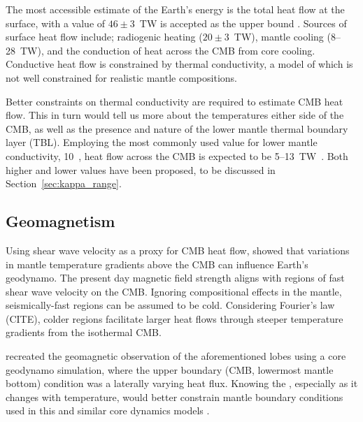 The most accessible estimate of the Earth's energy is the total heat flow at the surface, with a value of $46\pm3$~TW is accepted as the upper bound \citep{Lay2008}. Sources of surface heat flow include; radiogenic heating ($20\pm3$~TW), mantle cooling (8--28~TW), and the conduction of heat across the CMB from core cooling. Conductive heat flow is constrained by thermal conductivity, a model of which is not well constrained for realistic mantle compositions.

Better constraints on thermal conductivity are required to estimate CMB heat flow. This in turn would tell us more about the temperatures either side of the CMB, as well as the presence and nature of the lower mantle thermal boundary layer (TBL). Employing the most commonly used value for lower mantle conductivity, 10~\wmk, heat flow across the CMB is expected to be 5--13~TW~\citep{Lay2008}. Both higher and lower values have been proposed, to be discussed in Section~\ref{sec:kappa_range}.


\subsection{Geomagnetism}

Using shear wave velocity as a proxy for CMB heat flow, \citet{Gubbins2007} showed that variations in mantle temperature gradients above the CMB can influence Earth's geodynamo. The present day magnetic field strength aligns with regions of fast shear wave velocity on the CMB. Ignoring compositional effects in the mantle, seismically-fast regions can be assumed to be cold. Considering Fourier's law (CITE), colder regions facilitate larger heat flows through steeper temperature gradients from the isothermal CMB.

\citet{Gubbins2007} recreated the geomagnetic observation of the aforementioned lobes using a core geodynamo simulation, where the upper boundary (CMB, lowermost mantle bottom) condition was a laterally varying heat flux. Knowing the \tc, especially as it changes with temperature, would better constrain mantle boundary conditions used in this and similar core dynamics models \citep{Ammann2014}.








